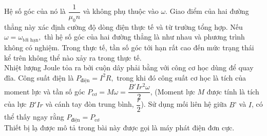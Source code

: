 \begin{loigiai}
\begin{figure}[h!]
    \caption{}
    \label{ng.h2}
\end{figure}

Hệ số góc của nó là $ \dfrac{1}{\mu_0n}$ và không phụ thuộc vào  $\omega$. Giao điểm của hai đường thẳng này xác định cường độ dòng điện thực tế và từ trường tổng hợp. Nếu $\omega=\omega_{\text{tới hạn}},$ thì hệ số góc của hai đường thẳng là như nhau và phương trình không có nghiệm. Trong thực tế, tần số góc tới hạn rất cao đến mức trạng thái kể trên không thể nào xảy ra trong thực tế.\\
Nhiệt lượng Joule tỏa ra bởi cuộn dây phải bằng với công cơ học dùng để quay đĩa. Công suất điện là $P_{\text{điện}}=I^2R,$ trong khi đó công suất cơ học là tích của moment lực và tần số góc $P_{\text{cơ}}=M\omega=\dfrac{B'{I}{{r}^2}\omega}{2}$, (Moment lực $M$ được tính là tích của lực $ B'{Ir}$ và cánh tay đòn trung bình, $\dfrac{r}{2}$). Sử dụng mối liên hệ giữa $B’$ và $I$, có thể thấy ngay rằng $P_{\text{điện}}=P_{\text{cơ}}$\\
Thiết bị lạ được mô tả trong bài này được gọi là máy phát điện đơn cực.
\end{loigiai}



